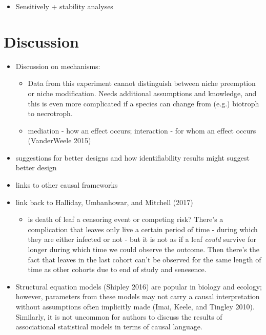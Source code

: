 \documentclass[]{article}
\providecommand{\tightlist}{%
  \setlength{\itemsep}{0pt}\setlength{\parskip}{0pt}}
\begin{document}
\begin{itemize}
\tightlist
\item
  Sensitively + stability analyses
\end{itemize}

\hypertarget{discussion}{%
\section{Discussion}\label{discussion}}

\begin{itemize}
\tightlist
\item
  Discussion on mechanisms:

  \begin{itemize}
  \tightlist
  \item
    Data from this experiment cannot distinguish between niche
    preemption or niche modification. Needs additional assumptions and
    knowledge, and this is even more complicated if a species can change
    from (e.g.) biotroph to necrotroph.
  \item
    mediation - how an effect occurs; interaction - for whom an effect
    occurs (VanderWeele 2015)
  \end{itemize}
\item
  suggestions for better designs and how identifiability results might
  suggest better design
\item
  links to other causal frameworks
\item
  link back to Halliday, Umbanhowar, and Mitchell (2017)

  \begin{itemize}
  \tightlist
  \item
    is death of leaf a censoring event or competing risk? There's a
    complication that leaves only live a certain period of time - during
    which they are either infected or not - but it is not as if a leaf
    \emph{could} survive for longer during which time we could observe
    the outcome. Then there's the fact that leaves in the last cohort
    can't be observed for the same length of time as other cohorts due
    to end of study and senesence.
  \end{itemize}
\item
  Structural equation models (Shipley 2016) are popular in biology and
  ecology; however, parameters from these models may not carry a causal
  interpretation without assumptions often implicitly made (Imai, Keele,
  and Tingley 2010). Similarly, it is not uncommon for authors to
  discuss the results of associational statistical models in terms of
  causal language.
\end{itemize}
\end{document}
